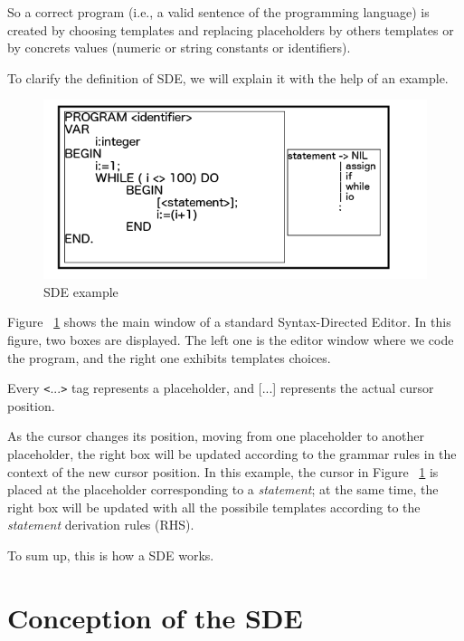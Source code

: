 \documentclass[
  oneside,
  11pt, a4paper,
  footinclude=true,
  headinclude=true,
  cleardoublepage=empty
]{scrbook}
\begin{document}
So a correct program (i.e., a valid sentence of the programming language) is created by choosing templates and replacing placeholders by others templates or by concrets values (numeric or string constants or identifiers).


To clarify the definition of SDE, we will explain it with the help of an example.

\begin{figure}[h!]
  \centering
    \includegraphics[width=1\textwidth]{img/SDE.png}
    \caption{SDE example}
    \label{fig:SDE}
\end{figure}


Figure ~\ref{fig:SDE} shows the main window of a standard Syntax-Directed Editor.
In this figure, two boxes are displayed.
The left one is the editor window where we code the program, and the right one exhibits templates choices.

Every \texttt{<}...\texttt{>}  tag represents a placeholder, and [...] represents the actual cursor position.

As the cursor changes its position, moving from one placeholder to another placeholder, the right box will be updated according to the grammar rules in the context of the new cursor position.
In this example, the cursor in Figure ~\ref{fig:SDE} is placed at the placeholder corresponding to a \textit{statement}; at the same time, the right box will be updated with all the possibile templates according to the \textit{statement} derivation rules (RHS).

To sum up, this is how a SDE works.

\section{Conception of the SDE}
\end{document}
